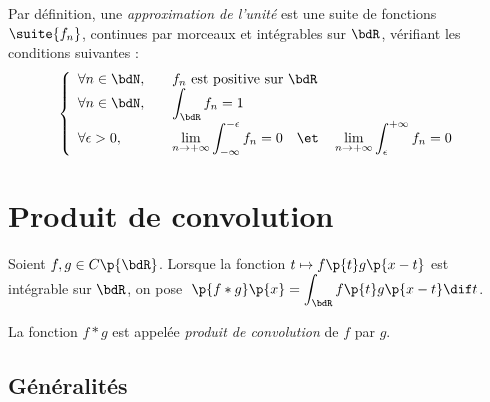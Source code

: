 \documentclass[a4paper,french,bookmarks]{article}
\begin{document}
    Par définition, une \emph{approximation de l'unité} est une suite de fonctions $\suite{f_n}$, continues par morceaux et intégrables sur $\bdR$, vérifiant les conditions suivantes :
    \[ \left\lbrace\begin{array}{lll}
        \forall n \in \bdN,& &f_n \ \text{est positive sur} \ \bdR  \\
        \forall n \in \bdN,& &\displaystyle\int_\bdR f_n = 1\\
        \forall \epsilon > 0,& &\displaystyle\lim_{n \to +\infty} \int_{-\infty}^{-\epsilon} f_n = 0 \quad\et\quad \lim_{n \to +\infty} \int_\epsilon^{+\infty} f_n = 0
    \end{array}\right.\]
    
    \section{Produit de convolution}
    
    Soient $f, g \in C\p{\bdR}$. Lorsque la fonction $t \mapsto f\p{t}g\p{x - t}$ est intégrable sur $\bdR$, on pose $\;\displaystyle\p{f \ast g}\p{x} = \int_\bdR f\p{t}g\p{x - t}\dif t$.
    
    La fonction $f \ast g$ est appelée \emph{produit de convolution} de $f$ par $g$.
    
    \subsection{Généralités}
    
\end{document}
